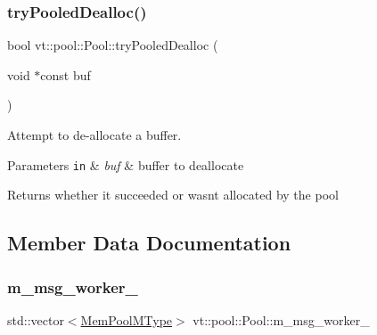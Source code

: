 \subsubsection{\texorpdfstring{try\+Pooled\+Dealloc()}{tryPooledDealloc()}}
{\footnotesize\ttfamily bool vt\+::pool\+::\+Pool\+::try\+Pooled\+Dealloc (\begin{DoxyParamCaption}\item[{void $\ast$const}]{buf }\end{DoxyParamCaption})\hspace{0.3cm}{\ttfamily [private]}}



Attempt to de-\/allocate a buffer. 


\begin{DoxyParams}[1]{Parameters}
\mbox{\tt in}  & {\em buf} & buffer to deallocate\\
\hline
\end{DoxyParams}
\begin{DoxyReturn}{Returns}
whether it succeeded or wasn\textquotesingle{}t allocated by the pool 
\end{DoxyReturn}


\subsection{Member Data Documentation}
\mbox{\label{structvt_1_1pool_1_1_pool_a86b8d7208cd3e42c821e23f0ab654d26}} 
\subsubsection{\texorpdfstring{m\+\_\+msg\+\_\+worker\+\_\+}{m\_msg\_worker\_}}
{\footnotesize\ttfamily std\+::vector$<$\hyperlink{structvt_1_1pool_1_1_pool_a8a201b9a843e47cd4e7b568a8e4483da}{Mem\+Pool\+M\+Type}$>$ vt\+::pool\+::\+Pool\+::m\+\_\+msg\+\_\+worker\+\_\+\hspace{0.3cm}{\ttfamily [private]}}

\mbox{\label{structvt_1_1pool_1_1_pool_a268cb9b30cde3272c49e67e781f0345e}} 
